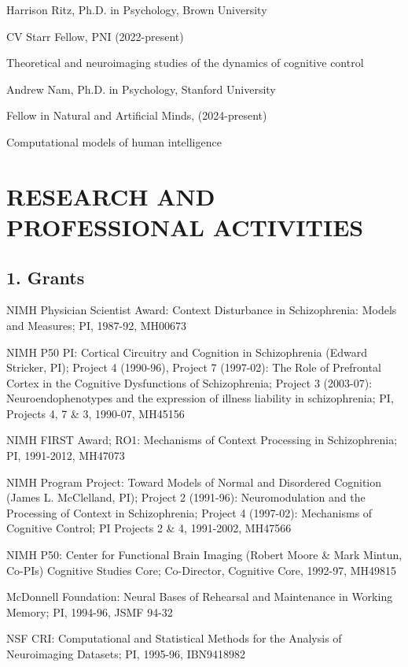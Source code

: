 \documentclass[10 pt]{article}
\begin{document}
Harrison Ritz, Ph.D. in Psychology, Brown University

CV Starr Fellow, PNI (2022-present)

Theoretical and neuroimaging studies of the dynamics of cognitive control
    \medskip

Andrew Nam, Ph.D. in Psychology, Stanford University

Fellow in Natural and Artificial Minds, (2024-present)

Computational models of human intelligence
    \medskip


\section*{RESEARCH AND PROFESSIONAL ACTIVITIES} \label{secRAPA}

\subsection*{1. Grants} \label{secRAPA1}

NIMH Physician Scientist Award:
Context Disturbance in Schizophrenia: Models and Measures;
PI,
1987-92,
MH00673

NIMH P50 PI:
Cortical Circuitry and Cognition in Schizophrenia (Edward Stricker, PI);
Project 4 (1990-96),
Project 7 (1997-02): The Role of Prefrontal Cortex in the Cognitive Dysfunctions of Schizophrenia;
Project 3 (2003-07): Neuroendophenotypes and the expression of illness liability in schizophrenia;
PI, Projects 4, 7 \& 3,
1990-07,
MH45156

NIMH FIRST Award; RO1:
Mechanisms of Context Processing in Schizophrenia;
PI,
1991-2012,
MH47073

NIMH Program Project:
Toward Models of Normal and Disordered Cognition (James L. McClelland, PI);
Project 2 (1991-96): Neuromodulation and the Processing of Context in Schizophrenia;
Project 4 (1997-02): Mechanisms of Cognitive Control;
PI Projects 2 \& 4,
1991-2002,
MH47566

NIMH P50:
Center for Functional Brain Imaging (Robert Moore \& Mark Mintun, Co-PIs) Cognitive Studies Core;
Co-Director, Cognitive Core,
1992-97,
MH49815

McDonnell Foundation:
Neural Bases of Rehearsal and Maintenance in Working Memory;
PI,
1994-96,
JSMF 94-32

NSF CRI:
Computational and Statistical Methods for the Analysis of Neuroimaging Datasets;
PI,
1995-96,
IBN9418982
\end{document}
